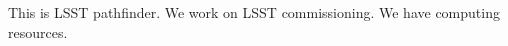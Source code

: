 \documentclass[11pt]{article}
\begin{document}


% 
% 
%

\otherfacilities

This is LSST pathfinder. We work on LSST commissioning. We have computing resources.


%
%
%
%
%
\end{document}
